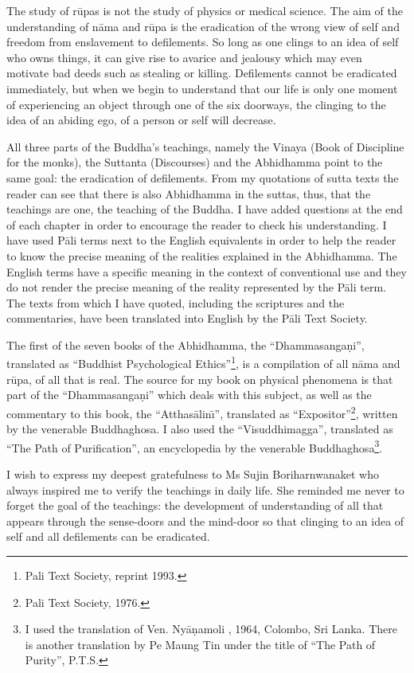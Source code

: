 \documentclass{book}
\begin{document}
The study of r\=upas is not the study of physics or medical science. The
aim of the understanding of n{\=a}ma and r\=upa is the eradication of
the wrong view of self and freedom from enslavement to defilements. So
long as one clings to an idea of self who owns things, it can give rise
to avarice and jealousy which may even motivate bad deeds such as
stealing or killing. Defilements cannot be eradicated immediately, but
when we begin to understand that our life is only one moment of
experiencing an object through one of the six doorways, the clinging to
the idea of an abiding ego, of a person or self will decrease. 

All three parts of the Buddha's teachings, namely the Vinaya (Book of
Discipline for the monks), the Suttanta (Discourses) and the Abhidhamma
point to the same goal: the eradication of defilements. From my
quotations of sutta texts the reader can see that there is also
Abhidhamma in the suttas, thus, that the teachings are one, the
teaching of the Buddha. I have added questions at the end of each
chapter in order to encourage the reader to check his understanding. I
have used P{\=a}li terms next to the English equivalents in order to
help the reader to know the precise meaning of the realities explained
in the Abhidhamma. The English terms have a specific meaning in the
context of conventional use and they do not render the precise meaning
of the reality represented by the P{\=a}li term. The texts from which I
have quoted, including the scriptures and the commentaries, have been
translated into English by the P{\=a}li Text Society.


The first of the seven books of the Abhi\-dhamma, the ``Dham\-ma\-sanga\d ni'',
translated as ``Buddhist Psychological Ethics''\footnote{Pali Text
Society, reprint 1993.}, is a compilation of all n{\=a}ma and r\=upa,
of all that is real. The source for my book on physical phenomena is
that part of the ``Dhamma\-sanga\d ni'' which deals with this subject, as
well as the commentary to this book, the ``Atthas{\=a}lin\=\i'',
translated as ``Expositor''\footnote{Pali Text Society, 1976.},
written by the venerable Buddhaghosa. I also used the
``Visuddhimagga'', translated as ``The Path of Purification'', an
encyclopedia by the venerable Buddhaghosa\footnote{I used the
translation of Ven. Ny{\=a}\d namoli , 1964, Colombo, Sri Lanka. There
is another translation by Pe Maung Tin under the title of ``The Path of
Purity'', P.T.S.}. 

I wish to express my deepest gratefulness to Ms Sujin Boriharnwanaket who always inspired me to verify the teachings in daily life. She reminded me never to forget the goal of the teachings: the development of understanding of all that appears through the sense-doors and the mind-door so that clinging to an idea of self and all defilements can be eradicated.
\end{document}
